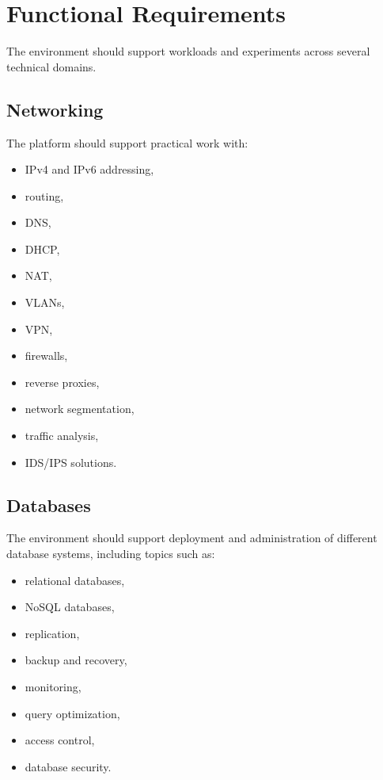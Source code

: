 \section{Functional Requirements}

The environment should support workloads and experiments across several
technical domains.

\subsection{Networking}

The platform should support practical work with:

\begin{itemize}
    \item IPv4 and IPv6 addressing,
    \item routing,
    \item DNS,
    \item DHCP,
    \item NAT,
    \item VLANs,
    \item VPN,
    \item firewalls,
    \item reverse proxies,
    \item network segmentation,
    \item traffic analysis,
    \item IDS/IPS solutions.
\end{itemize}

\newpage
\subsection{Databases}

The environment should support deployment and administration of different
database systems, including topics such as:

\begin{itemize}
    \item relational databases,
    \item NoSQL databases,
    \item replication,
    \item backup and recovery,
    \item monitoring,
    \item query optimization,
    \item access control,
    \item database security.
\end{itemize}

